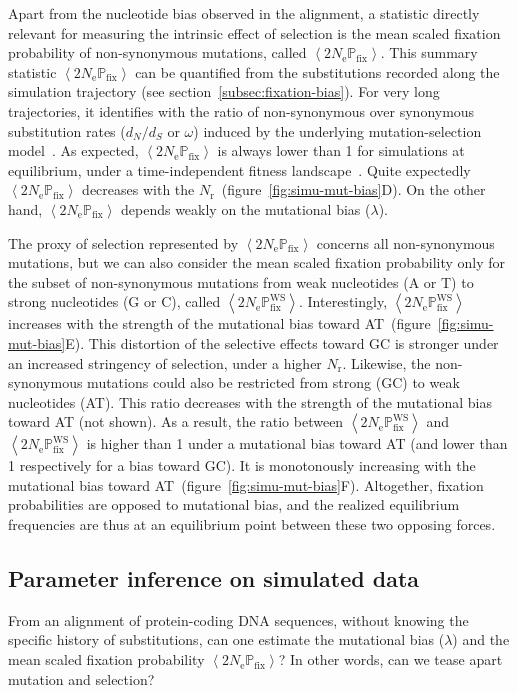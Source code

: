\documentclass{article}
\newcommand{\Ne}{N_{\text{e}}}
\newcommand{\Ner}{N_{\text{r}}}
\newcommand{\dn}{d_N}
\newcommand{\ds}{d_S}
\newcommand{\dnds}{\dn / \ds}
\newcommand{\proba}{\mathbb{P}}
\newcommand{\Pfix}{2 \Ne \proba_{\text{fix}}}
\newcommand{\avgpfix}{\left\langle \Pfix \right\rangle }
\newcommand{\avgpfixATtoGC}{\left\langle \Pfix^{\text{WS}} \right\rangle }
\begin{document}
Apart from the nucleotide bias observed in the alignment, a statistic directly relevant for measuring the intrinsic effect of selection is the mean scaled fixation probability of {non-synonymous} mutations, called $\avgpfix$.
This summary statistic $\avgpfix$ can be quantified from the {substitutions} recorded along the simulation trajectory (see section~\ref{subsec:fixation-bias}).
For very long trajectories, it identifies with the ratio of {non-synonymous} over {synonymous} {substitution} rates ($\dnds$ or $\omega$) induced by the underlying mutation-selection model~\citep{Spielman2015, DosReis2015, Jones2016}.
As expected, $\avgpfix$ is always lower than 1 for simulations at equilibrium, under a time-independent fitness landscape~\citep{Spielman2015}.
Quite expectedly $\avgpfix$ decreases with the $\Ner$~(figure~\ref{fig:simu-mut-bias}D).
On the other hand, $\avgpfix$ depends weakly on the mutational bias ($\lambda$).

The proxy of selection represented by $\avgpfix$ concerns all {non-synonymous} mutations, but we can also consider the mean scaled fixation probability only for the subset of {non-synonymous} mutations from weak nucleotides (A or T) to strong nucleotides (G or C), called $\avgpfixATtoGC$.
Interestingly, $\avgpfixATtoGC$ increases with the strength of the mutational bias toward AT~(figure~\ref{fig:simu-mut-bias}E).
This distortion of the selective effects toward GC is stronger under an increased stringency of selection, under a higher $\Ner$.
Likewise, the {non-synonymous} mutations could also be restricted from strong (GC) to weak nucleotides (AT).
This ratio decreases with the strength of the mutational bias toward AT (not shown).
As a result, the ratio between $\avgpfixATtoGC$ and $\avgpfixATtoGC$ is higher than 1 under a mutational bias toward AT (and lower than 1 respectively for a bias toward GC).
It is monotonously increasing with the mutational bias toward AT~(figure~\ref{fig:simu-mut-bias}F).
Altogether, fixation probabilities are opposed to mutational bias, and the realized equilibrium frequencies are thus at an equilibrium point between these two opposing forces.

\subsection{Parameter inference on simulated data}
\label{subsec:parameter-inference-on-simulated-data}

From an alignment of protein-coding {DNA} sequences, without knowing the specific history of {substitutions}, can one estimate the mutational bias ($\lambda$) and the mean scaled fixation probability $\avgpfix$?
In other words, can we tease apart mutation and selection?
\end{document}
